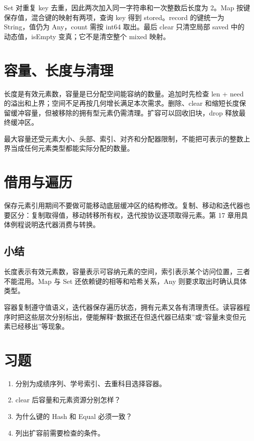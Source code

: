 Set 对重复 key 去重，因此两次加入同一字符串和一次整数后长度为 2。Map 按键保存值，混合键的映射有两项，查询 key 得到 stored。record 的键统一为 String，值仍为 Any，count 需按 int64 取出。最后 clear 只清空局部 saved 中的动态值，isEmpty 变真；它不是清空整个 mixed 映射。

\section{容量、长度与清理}

长度是有效元素数，容量是已分配空间能容纳的数量。追加时先检查 len + need 的溢出和上界；空间不足再按几何增长满足本次需求。删除、clear 和缩短长度保留缓冲容量，但被移除的拥有型元素仍需清理。扩容可以回收旧块，drop 释放最终缓冲区。

最大容量还受元素大小、头部、索引、对齐和分配器限制，不能把可表示的整数上界当成任何元素类型都能实际分配的数量。

\section{借用与遍历}

保存元素引用期间不要做可能移动底层缓冲区的结构修改。复制、移动和迭代器也要区分：复制取得值，移动转移所有权，迭代按协议逐项取得元素。第 17 章用具体例程说明迭代器消费与转换。

\subsection*{小结}

长度表示有效元素数，容量表示可容纳元素的空间，索引表示某个访问位置，三者不能混用。Map 与 Set 还依赖键的相等和哈希关系，Any 则要求取出时确认具体类型。

容器复制遵守值语义，迭代器保存遍历状态，拥有元素又各有清理责任。读容器程序时把这些层次分别标出，便能解释“数据还在但迭代器已结束”或“容量未变但元素已经移出”等现象。

\section{习题}

\begin{enumerate}

\item 分别为成绩序列、学号索引、去重科目选择容器。

\item clear 后容量和元素资源分别怎样？

\item 为什么键的 Hash 和 Equal 必须一致？

\item 列出扩容前需要检查的条件。

\end{enumerate}

